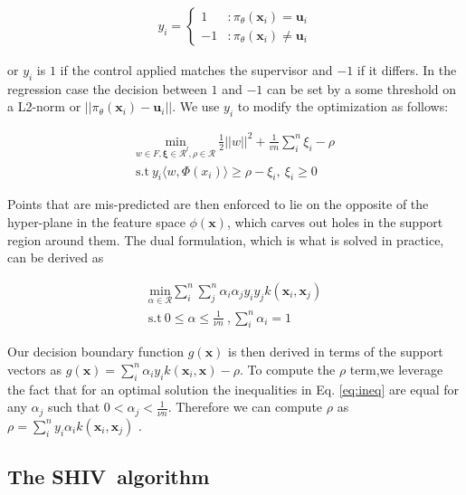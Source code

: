 \documentclass[10pt, conference]{ieeeconf}      %
\newcommand{\bu}{\mathbf{u}}
\newcommand{\bx}{\mathbf{x}}
\newcommand{\mR}{\mathcal{R}}
\newcommand{\acro}{SHIV}
\begin{document}
\begin{align}
y_i = \left\{
     \begin{array}{lr}
       1 & : \pi_{\theta}(\bx_i) =\bu_i\\
       -1 & : \pi_{\theta}(\bx_i) \neq \bu_i
     \end{array}
   \right.
\end{align}

or $y_i$ is $1$ if the control applied matches the supervisor and $-1$ if it differs. In the regression case the decision between $1$ and $-1$ can be set by a some threshold on a L2-norm or $||\pi_{\theta}(\bx_i)-\bu_i||$. We use $y_i$ to modify the optimization as follows: 

\vspace{-2ex}
\begin{align}\label{eq:primal_sup}
\underset{w\in F, \mathbf{\xi} \in \mR^l, \rho \in \mR}{\mbox{min}}\: \frac{1}{2}||w||^2+\frac{1}{vn} \sum^n_i \xi_i - \rho\\
\mbox{s.t} \: y_i \langle w,\Phi(x_i)\rangle \geq \rho - \xi_i, \: \xi_i \geq 0 \label{eq:ineq}
\end{align}

Points that are mis-predicted are then enforced to lie on the opposite of the hyper-plane in the feature space $\phi(\bx)$, which carves out holes in the support region around them. The dual formulation, which is what is solved in practice, can be derived as 

\vspace{-2ex}
\begin{align}\label{eq:dual_sup}
\underset{\alpha\in \mathcal{R}}{\mbox{min}} \sum_i^n \sum_j^n \alpha_i\alpha_j y_i y_jk(\bx_i,\bx_j)\\
\mbox{s.t} \: 0 \leq \alpha \leq \frac{1}{\nu n} \:, \sum_i^n \alpha_i = 1 
\end{align}

Our decision boundary function $g(\bx)$ is then derived in terms of the support vectors as $g(\bx) = \sum_i^n \alpha_i y_i k(\bx_i,\bx) - \rho$. To compute the $\rho$ term,we leverage the fact that for an optimal solution the inequalities in Eq. \ref{eq:ineq} are equal for any $\alpha_j$ such that $0 < \alpha_j < \frac{1}{\nu n}$. Therefore we can compute $\rho$ as  $\rho = \sum_i^n y_i \alpha_i k(\bx_i,\bx_j)$ \cite{scholkopf2001estimating}. 




\subsection{The \acro~algorithm}
\end{document}
